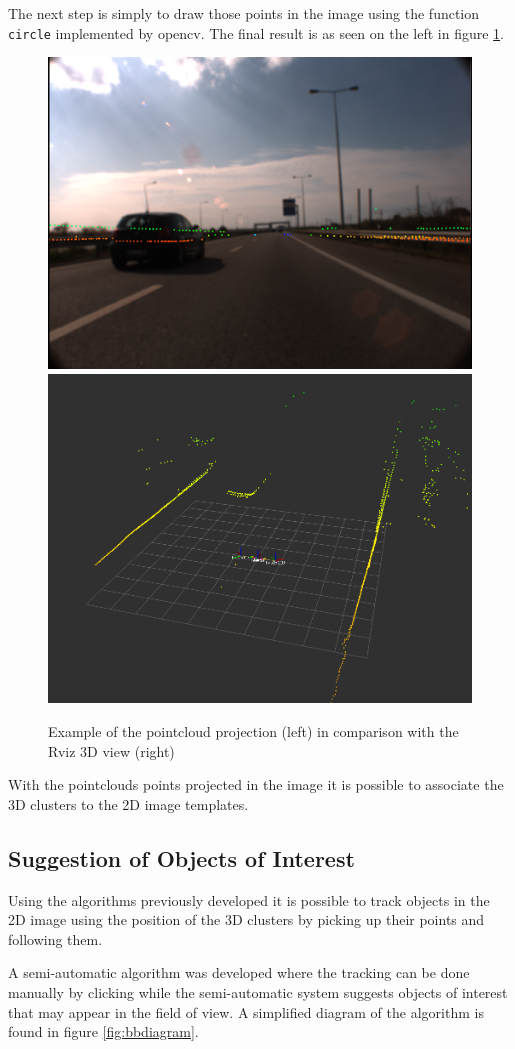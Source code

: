 The next step is simply to draw those points in the image using the function \texttt{circle} implemented by \gls{opencv}. The final result is as seen on the left in figure \ref{fig:projectpoints}.

\begin{figure}[htp]
	
	\centering
	\includegraphics[width=.47\textwidth]{caplabel/imgs/projectpc.png}
	\includegraphics[width=.45\textwidth]{caplabel/imgs/rvizpc.png}
	
	\caption{Example of the pointcloud projection (left) in comparison with the Rviz 3D view (right)}
	\label{fig:projectpoints}
	
\end{figure}

With the pointclouds points projected in the image it is possible to associate the 3D clusters to the 2D image templates.


\subsection{Suggestion of Objects of Interest}

Using the algorithms previously developed it is possible to track objects in the 2D image using the position of the 3D clusters by picking up their points and following them.

A semi-automatic algorithm was developed where the tracking can be done manually by clicking while the semi-automatic system suggests objects of interest that may appear in the field of view. A simplified diagram of the algorithm is found in figure \ref{fig:bbdiagram}.

